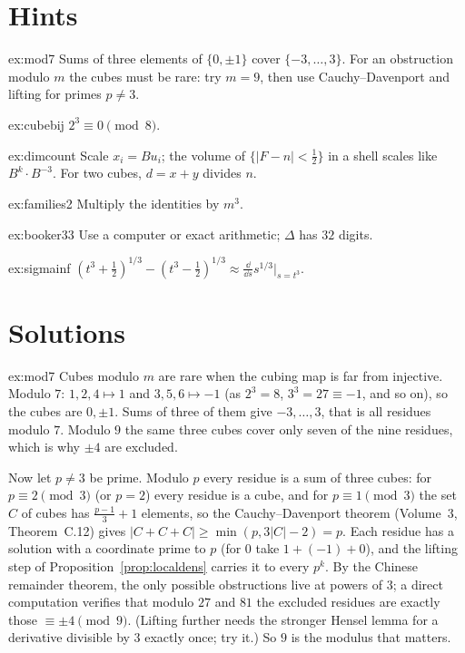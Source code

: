 \section{Hints}

\begin{hint}{ex:mod7}
Sums of three elements of $\{0,\pm1\}$ cover $\{-3,\dots,3\}$. For an obstruction modulo $m$ the cubes must be rare: try $m=9$, then use Cauchy--Davenport and lifting for primes $p\ne3$.
\end{hint}

\begin{hint}{ex:cubebij}
$2^3\equiv0\pmod8$.
\end{hint}

\begin{hint}{ex:dimcount}
Scale $x_i=Bu_i$; the volume of $\{|F-n|<\frac12\}$ in a shell scales like $B^{k}\cdot B^{-3}$. For two cubes, $d=x+y$ divides $n$.
\end{hint}

\begin{hint}{ex:families2}
Multiply the identities by $m^3$.
\end{hint}

\begin{hint}{ex:booker33}
Use a computer or exact arithmetic; $\Delta$ has $32$ digits.
\end{hint}

\begin{hint}{ex:sigmainf}
$(t^3+\frac12)^{1/3}-(t^3-\frac12)^{1/3}\approx\frac{\dd}{\dd s}s^{1/3}\big|_{s=t^3}$.
\end{hint}

\section{Solutions}

\begin{solution}{ex:mod7}
\idea Cubes modulo $m$ are rare when the cubing map is far from injective.
\writeup Modulo $7$: $1,2,4\mapsto1$ and $3,5,6\mapsto-1$ (as $2^3=8$, $3^3=27\equiv-1$, and so on), so the cubes are $0,\pm1$. Sums of three of them give $-3,\dots,3$, that is all residues modulo $7$. Modulo $9$ the same
three cubes cover only seven of the nine residues, which is why $\pm4$ are excluded.

Now let $p\ne3$ be prime. Modulo $p$ every residue is a sum of three cubes: for $p\equiv2\pmod3$ (or $p=2$) every residue is a cube, and for $p\equiv1\pmod3$ the set $C$ of cubes has $\frac{p-1}3+1$ elements, so the Cauchy--Davenport theorem (Volume~3, Theorem~C.12) gives $|C+C+C|\ge\min(p,3|C|-2)=p$. Each residue has a solution with a coordinate prime to $p$ (for $0$ take $1+(-1)+0$), and the lifting step of Proposition~\ref{prop:localdens} carries it to every $p^k$. By the Chinese remainder theorem, the only possible obstructions live at powers of $3$; a direct computation verifies that modulo $27$ and $81$ the excluded residues are exactly those $\equiv\pm4\pmod9$. (Lifting further needs the stronger Hensel lemma for a derivative divisible by $3$ exactly once; try it.) So $9$ is the modulus that matters.
\end{solution}

